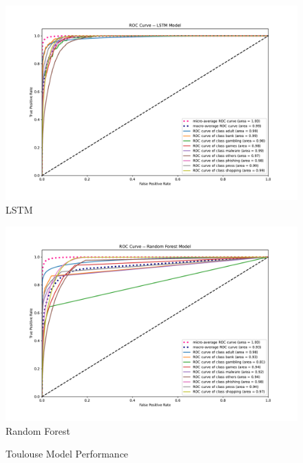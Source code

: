 \documentclass[12pt, letterpaper]{article}
\begin{document}
\begin{figure}[!htb]
\centering
\caption{Toulouse Model Performance}\label{toulouse_lstm_rf_svm}
	\begin{minipage}[b]{0.3\textwidth}
	\centering
	\label{toulouse_lstm}
	\includegraphics[width=\textwidth]{../figs/roc-toulouse-2017-lstm.pdf}\\LSTM
	\end{minipage}
	\begin{minipage}[b]{0.3\textwidth}
	\centering
	\label{toulouse_rf}
	\includegraphics[width=\textwidth]{../figs/roc-toulouse-2017-rf.pdf}\\Random Forest
	\end{minipage}
	\begin{minipage}[b]{0.3\textwidth}
	\centering
	\label{toulouse_rf}

\end{minipage}
\end{figure}
\end{document}
